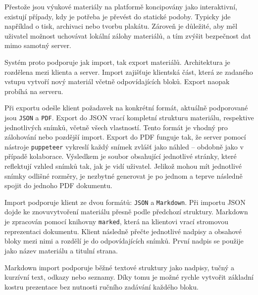 Přestože jsou výukové materiály na platformě koncipovány jako interaktivní, existují případy, kdy je potřeba je převést do statické podoby.
Typicky jde například o tisk, archivaci nebo tvorbu plakátu. 
Zároveň je důležité, aby měl uživatel možnost uchovávat lokální zálohy materiálů, a tím zvýšit bezpečnost dat mimo samotný server.

Systém proto podporuje jak import, tak export materiálů. 
Architektura je rozdělena mezi klienta a server. Import zajišťuje klientská část, která ze zadaného vstupu vytvoří nový materiál včetně odpovídajících bloků. 
Export naopak probíhá na serveru.

Při exportu odešle klient požadavek na konkrétní formát, aktuálně podporované jsou \texttt{JSON} a \texttt{PDF}. 
Export do JSON vrací kompletní strukturu materiálu, respektive jednotlivých snímků, včetně všech vlastností. 
Tento formát je vhodný pro zálohování nebo pozdější import. 
Export do PDF funguje tak, že server pomocí nástroje \texttt{puppeteer} vykreslí každý snímek zvlášť jako náhled -- obdobně jako v případě kolaborace. 
Výsledkem je soubor obsahující jednotlivé stránky, které reflektují vzhled snímků tak, jak je vidí uživatel.
Jelikož mohou mít jednotlivé snímky odlišné rozměry, je nezbytné generovat je po jednom a teprve následně spojit do jednoho PDF dokumentu.

Import podporuje klient ze dvou formátů: \texttt{JSON} a \texttt{Markdown}. 
Při importu JSON dojde ke znovuvytvoření materiálu přesně podle předchozí struktury. 
Markdown je zpracován pomocí knihovny \texttt{marked}, která na klientovi vrací stromovou reprezentaci dokumentu. 
Klient následně přečte jednotlivé nadpisy a obsahové bloky mezi nimi a rozdělí je do odpovídajících snímků. 
První nadpis se použije jako název materiálu a titulní strana.

Markdown import podporuje běžné textové struktury jako nadpisy, tučný a kurzívní text, odkazy nebo seznamy. 
Díky tomu je možné rychle vytvořit základní kostru prezentace bez nutnosti ručního zadávání každého bloku.



